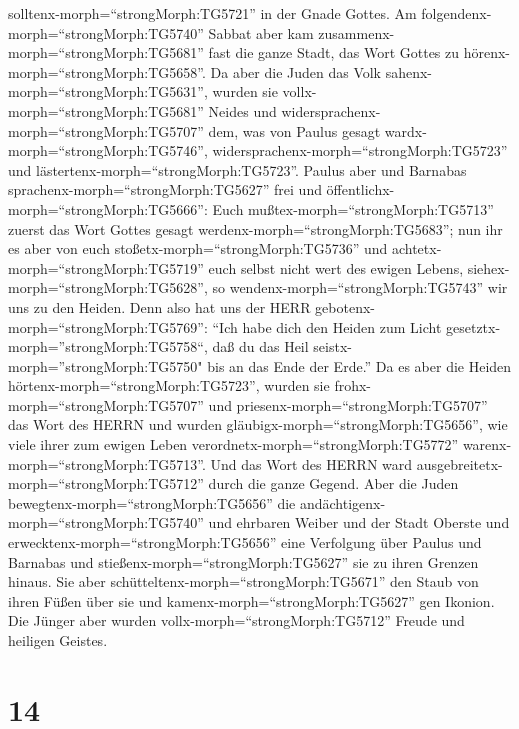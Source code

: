 solltenx-morph=``strongMorph:TG5721'' in der Gnade Gottes. 
Am folgendenx-morph=``strongMorph:TG5740'' Sabbat aber kam
zusammenx-morph=``strongMorph:TG5681'' fast die ganze Stadt, das Wort
Gottes zu hörenx-morph=``strongMorph:TG5658''.  Da aber die
Juden das Volk sahenx-morph=``strongMorph:TG5631'', wurden sie
vollx-morph=``strongMorph:TG5681'' Neides und
widersprachenx-morph=``strongMorph:TG5707'' dem, was von Paulus gesagt
wardx-morph=``strongMorph:TG5746'',
widersprachenx-morph=``strongMorph:TG5723'' und
lästertenx-morph=``strongMorph:TG5723''.  Paulus aber und
Barnabas sprachenx-morph=``strongMorph:TG5627'' frei und
öffentlichx-morph=``strongMorph:TG5666'': Euch
mußtex-morph=``strongMorph:TG5713'' zuerst das Wort Gottes gesagt
werdenx-morph=``strongMorph:TG5683''; nun ihr es aber von euch
stoßetx-morph=``strongMorph:TG5736'' und
achtetx-morph=``strongMorph:TG5719'' euch selbst nicht wert des ewigen
Lebens, siehex-morph=``strongMorph:TG5628'', so
wendenx-morph=``strongMorph:TG5743'' wir uns zu den Heiden.
 Denn also hat uns der HERR
gebotenx-morph=``strongMorph:TG5769'': ``Ich habe dich den Heiden zum
Licht gesetztx-morph=''strongMorph:TG5758``, daß du das Heil
seistx-morph=''strongMorph:TG5750" bis an das Ende der Erde.''
 Da es aber die Heiden
hörtenx-morph=``strongMorph:TG5723'', wurden sie
frohx-morph=``strongMorph:TG5707'' und
priesenx-morph=``strongMorph:TG5707'' das Wort des HERRN und wurden
gläubigx-morph=``strongMorph:TG5656'', wie viele ihrer zum ewigen Leben
verordnetx-morph=``strongMorph:TG5772''
warenx-morph=``strongMorph:TG5713''.  Und das Wort des
HERRN ward ausgebreitetx-morph=``strongMorph:TG5712'' durch die ganze
Gegend.  Aber die Juden
bewegtenx-morph=``strongMorph:TG5656'' die
andächtigenx-morph=``strongMorph:TG5740'' und ehrbaren Weiber und der
Stadt Oberste und erwecktenx-morph=``strongMorph:TG5656'' eine
Verfolgung über Paulus und Barnabas und
stießenx-morph=``strongMorph:TG5627'' sie zu ihren Grenzen hinaus.
 Sie aber schütteltenx-morph=``strongMorph:TG5671'' den
Staub von ihren Füßen über sie und kamenx-morph=``strongMorph:TG5627''
gen Ikonion.  Die Jünger aber wurden
vollx-morph=``strongMorph:TG5712'' Freude und heiligen Geistes.

\hypertarget{section-13}{%
\section{14}\label{section-13}}

